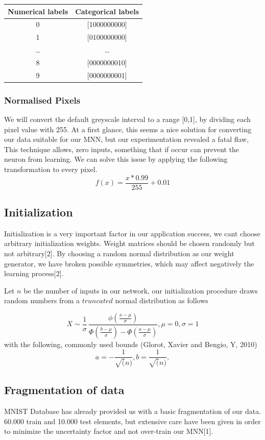 \documentclass{proc}
\begin{document}
	\begin{center}
		\begin{tabular}{ |c|c| } 
			\hline
			Numerical labels & Categorical labels \\
			\hline
			 0 & [1000000000] \\ 
			 1 & [0100000000] \\ 
			 \dots & \dots \\
			 8 & [0000000010] \\ 
			 9 & [0000000001] \\ 
			\hline
		\end{tabular}
	\end{center}
	\subsubsection{Normalised Pixels}
	We will convert the default greyscale interval to a range [0,1], by dividing each pixel value with 255. At a first glance, this seems a nice solution for converting our data suitable for our MNN, but our experimentation revealed a fatal flaw, This technique allows, zero inputs, something that if occur can prevent the neuron from learning. We can solve this issue by applying the following transformation to every pixel.
	\[
		f(x)=\frac{x*0.99}{255}+0.01
	\]
	\subsection{Initialization}
	Initialization is a very important factor in our application success, we cant choose arbitrary initialization weights. Weight matrices should be chosen randomly but not arbitrary[2]. By choosing a random normal distribution as our weight generator, we have broken possible symmetries, which may affect negatively the learning process[2].
	
	Let ${n}$ be the number of inputs in our network, our initialization procedure draws random numbers from a $truncated$ normal distribution as follows
	
	\[
		{\displaystyle X\sim{\frac {1}{\sigma }}\,{\frac {\phi ({\frac {x-\mu }{\sigma }})}{\Phi ({\frac {b-\mu }{\sigma }})-\Phi ({\frac {a-\mu }{\sigma }})}}},
		\mu=0,
		\sigma=1
	\]
	with the following, commonly used bounds (Glorot, Xavier and Bengio, Y, 2010)
	\[	a=-\frac{1}{\sqrt(n)},
		b=\frac{1}{\sqrt(n)},
	\] 
	\subsection{Fragmentation of data}
	MNIST Database has already provided us with a basic fragmentation of our data. 60.000 train and 10.000 test elements, but extensive care have been given in order to minimize the uncertainty factor and not over-train our MNN[1].
	
\end{document}
